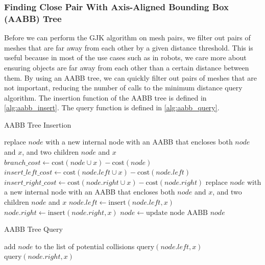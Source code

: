 \documentclass[12pt,fleqn]{article}
\begin{document}
\subsubsection{Finding Close Pair With Axis-Aligned Bounding Box (AABB) Tree}
Before we can perform the GJK algorithm on mesh pairs, we filter out pairs of meshes that are far away from each other by a given distance threshold. This is useful because in most of the use cases such as in robots, we care more about ensuring objects are far away from each other than a certain distance between them. By using an AABB tree, we can quickly filter out pairs of meshes that are not important, reducing the number of calls to the minimum distance query algorithm. The insertion function of the AABB tree is defined in \ref{alg:aabb_insert}. The query function is defined in \ref{alg:aabb_query}.


\begin{algorithm}
    \caption{AABB Tree Insertion}
    \begin{algorithmic}[1]
            \STATE replace $node$ with a new internal node with an AABB that encloses both $node$ and $x$, and two children $node$ and $x$
        \ELSE
            \STATE $branch\_cost \leftarrow \text{cost}(node \cup x) - \text{cost}(node)$
            \STATE $insert\_left\_cost \leftarrow \text{cost}(node.left \cup x) - \text{cost}(node.left)$
            \STATE $insert\_right\_cost \leftarrow \text{cost}(node.right \cup x) - \text{cost}(node.right)$
                \STATE replace $node$ with a new internal node with an AABB that encloses both $node$ and $x$, and two children $node$ and $x$
                \STATE $node.left \leftarrow \text{insert}(node.left, x)$
            \ELSE
                \STATE $node.right \leftarrow \text{insert}(node.right, x)$
            \ENDIF
        \ENDIF
        \STATE $node \leftarrow \text{update node AABB}$
        \RETURN $node$
    \end{algorithmic}
    \label{alg:aabb_insert}
\end{algorithm}

\begin{algorithm}
    \caption{AABB Tree Query} %
    \begin{algorithmic}[1]
            \STATE add $node$ to the list of potential collisions
            \STATE $\text{query}(node.left, x)$
            \STATE $\text{query}(node.right, x)$
        \ENDIF
    \end{algorithmic}
    \label{alg:aabb_query}
\end{algorithm}
\end{document}
